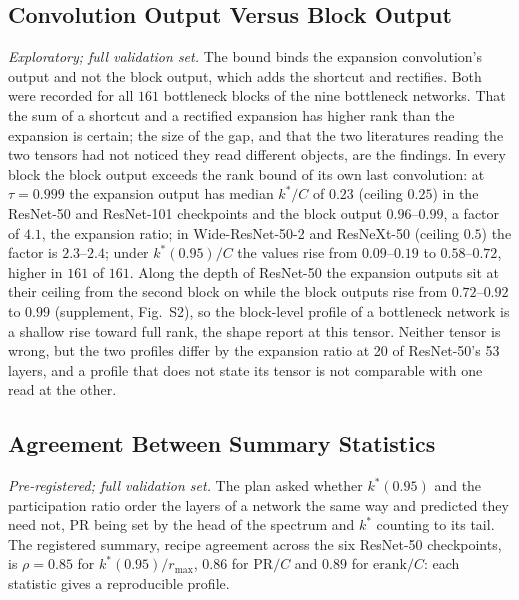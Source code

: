 \documentclass[10pt,journal,compsoc]{IEEEtran}
\begin{document}
\subsection{Convolution Output Versus Block Output}
\label{sec:blockout}

\emph{Exploratory; full validation set.} The bound binds the expansion
convolution's output and not the block output, which adds the shortcut and
rectifies. Both were recorded for all $161$ bottleneck blocks of the nine
bottleneck networks. That the sum of a shortcut and a rectified expansion
has higher rank than the expansion is certain; the size of the gap, and
that the two literatures reading the two tensors had not noticed they
read different objects, are the findings. In every block the block output exceeds the rank bound
of its own last convolution: at $\tau = 0.999$ the expansion output has
median $k^*/C$ of $0.23$ (ceiling $0.25$) in the ResNet-50 and ResNet-101
checkpoints and the block output $0.96$--$0.99$, a factor of $4.1$, the
expansion ratio; in Wide-ResNet-50-2 and ResNeXt-50 (ceiling $0.5$) the
factor is $2.3$--$2.4$; under $k^*(0.95)/C$ the values rise from
$0.09$--$0.19$ to $0.58$--$0.72$, higher in $161$ of $161$. Along the depth
of ResNet-50 the expansion outputs sit at their ceiling from the second
block on while the block outputs rise from $0.72$--$0.92$ to $0.99$
(supplement, Fig.~S2), so the block-level profile of a bottleneck network
is a shallow rise toward full rank, the shape \cite{elmoznino2024highDim}
report at this tensor. Neither tensor is wrong, but the two profiles differ
by the expansion ratio at 20 of ResNet-50's 53 layers, and a profile that
does not state its tensor is not comparable with one read at the other.

\subsection{Agreement Between Summary Statistics}
\label{sec:metrics}

\emph{Pre-registered; full validation set.} The plan asked whether
$k^*(0.95)$ and the participation ratio order the layers of a network the
same way and predicted they need not, PR being set by the head of the
spectrum and $k^*$ counting to its tail. The registered summary, recipe
agreement across the six ResNet-50 checkpoints, is $\rho = 0.85$ for
$k^*(0.95)/r_{\max}$, $0.86$ for $\mathrm{PR}/C$ and $0.89$ for
$\mathrm{erank}/C$: each statistic gives a reproducible profile.
\end{document}
